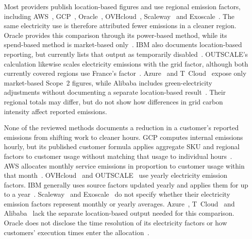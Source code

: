 Most providers publish location-based figures and use regional emission factors, including AWS~\cite{aws-ccft-model3}, GCP~\cite{schneider-mattia-2024}, Oracle~\cite{oracle-emissions-management}, OVHcloud~\cite{ovh-eit-v2}, Scaleway~\cite{scaleway-calculation-values} and Exoscale~\cite{exoscale-impact-methodology}.
The same electricity use is therefore attributed fewer emissions in a cleaner region.
Oracle provides this comparison through its power-based method, while its spend-based method is market-based only~\cite{oracle-emissions-management}.
IBM also documents location-based reporting, but currently lists that output as temporarily disabled~\cite{ibm-carbon-current}.
OUTSCALE's calculation likewise scales electricity emissions with the grid factor, although both currently covered regions use France's factor~\cite{outscale-carbon-methodology}.
Azure~\cite{azure-carbon-data} and T~Cloud~\cite{tcloud-sustainability-release} expose only market-based Scope~2 figures, while Alibaba includes green-electricity adjustments without documenting a separate location-based result~\cite{alibaba-cloud-carbon-footprint}.
Their regional totals may differ, but do not show how differences in grid carbon intensity affect reported emissions.

None of the reviewed methods documents a reduction in a customer's reported emissions from shifting work to cleaner hours.
GCP computes internal emissions hourly, but its published customer formula applies aggregate SKU and regional factors to customer usage without matching that usage to individual hours~\cite{schneider-mattia-2024}.
AWS allocates monthly service emissions in proportion to customer usage within that month~\cite{aws-ccft-model3}.
OVHcloud~\cite{ovh-eit-v2} and OUTSCALE~\cite{outscale-carbon-methodology} use yearly electricity emission factors.
IBM generally uses source factors updated yearly and applies them for up to a year~\cite{ibm-carbon-calc-v3}.
Scaleway~\cite{scaleway-calculation-values} and Exoscale~\cite{exoscale-impact-methodology} do not specify whether their electricity emission factors represent monthly or yearly averages.
Azure~\cite{azure-carbon-data}, T~Cloud~\cite{tcloud-sustainability-release} and Alibaba~\cite{alibaba-cloud-carbon-footprint} lack the separate location-based output needed for this comparison.
Oracle does not disclose the time resolution of its electricity factors or how customers' execution times enter the allocation~\cite{oracle-emissions-management}.


\endgroup
